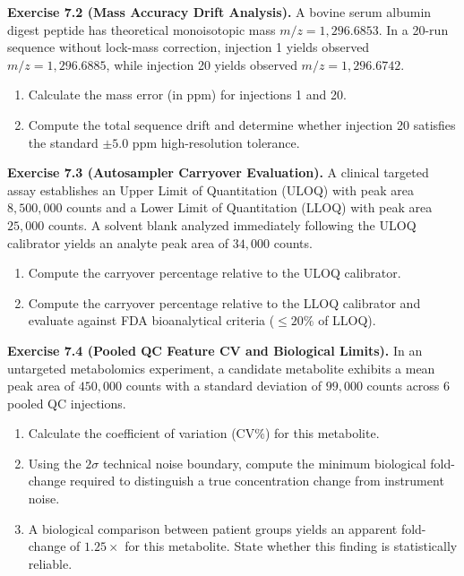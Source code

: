 \documentclass[11pt,twoside,openright]{book}
\begin{document}
\vspace{0.8em}
\noindent\textbf{Exercise 7.2 (Mass Accuracy Drift Analysis).}\enspace
\label{ex:mass_accuracy_drift}
A bovine serum albumin digest peptide has theoretical monoisotopic mass $m/z = 1,296.6853$. In a 20-run sequence without lock-mass correction, injection 1 yields observed $m/z = 1,296.6885$, while injection 20 yields observed $m/z = 1,296.6742$.
\begin{enumerate}
    \item Calculate the mass error (in ppm) for injections 1 and 20.
    \item Compute the total sequence drift and determine whether injection 20 satisfies the standard $\pm 5.0$ ppm high-resolution tolerance.
\end{enumerate}

\vspace{0.8em}
\noindent\textbf{Exercise 7.3 (Autosampler Carryover Evaluation).}\enspace
\label{ex:autosampler_carryover}
A clinical targeted assay establishes an Upper Limit of Quantitation (ULOQ) with peak area $8,500,000$ counts and a Lower Limit of Quantitation (LLOQ) with peak area $25,000$ counts. A solvent blank analyzed immediately following the ULOQ calibrator yields an analyte peak area of $34,000$ counts.
\begin{enumerate}
    \item Compute the carryover percentage relative to the ULOQ calibrator.
    \item Compute the carryover percentage relative to the LLOQ calibrator and evaluate against FDA bioanalytical criteria ($\le 20\%$ of LLOQ).
\end{enumerate}

\vspace{0.8em}
\noindent\textbf{Exercise 7.4 (Pooled QC Feature CV and Biological Limits).}\enspace
\label{ex:qc_cv_biological_limits}
In an untargeted metabolomics experiment, a candidate metabolite exhibits a mean peak area of $450,000$ counts with a standard deviation of $99,000$ counts across 6 pooled QC injections.
\begin{enumerate}
    \item Calculate the coefficient of variation ($\text{CV}\%$) for this metabolite.
    \item Using the $2\sigma$ technical noise boundary, compute the minimum biological fold-change required to distinguish a true concentration change from instrument noise.
    \item A biological comparison between patient groups yields an apparent fold-change of $1.25\times$ for this metabolite. State whether this finding is statistically reliable.
\end{enumerate}
\end{document}
